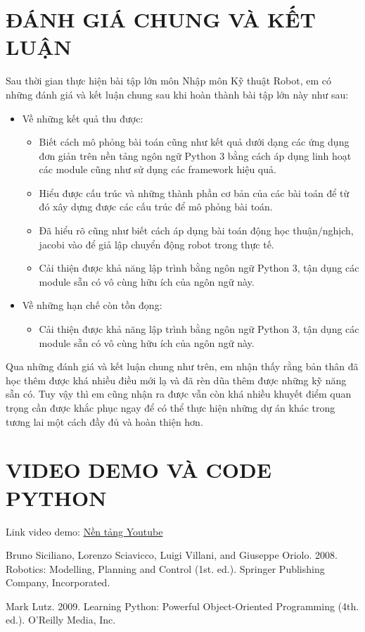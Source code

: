 \documentclass[a4paper]{article}
\begin{document}

\newpage
\tableofcontents
\newpage

\newpage

\newpage

\newpage

\newpage


\section{ĐÁNH GIÁ CHUNG VÀ KẾT LUẬN}
Sau thời gian thực hiện bài tập lớn môn Nhập môn Kỹ thuật Robot, em có những đánh giá và kết luận chung sau khi hoàn thành bài tập lớn này như sau:
\begin{itemize}
    \item Về những kết quả thu được:
    \begin{itemize}
        \item Biết cách mô phỏng bài toán cũng như kết quả dưới dạng các ứng dụng đơn giản trên nền tảng ngôn ngữ Python 3 bằng cách áp dụng linh hoạt các module cũng như sử dụng các framework hiệu quả.
        \item Hiểu được cấu trúc và những thành phần cơ bản của các bài toán để từ đó xây dựng được các cấu trúc để mô phỏng bài toán. 
        \item Đã hiểu rõ cũng như biết cách áp dụng bài toán động học thuận/nghịch, jacobi vào để giả lập chuyển động robot trong thực tế.
        \item Cải thiện được khả năng lập trình bằng ngôn ngữ Python 3, tận dụng các module sẵn có vô cùng hữu ích của ngôn ngữ này.
    \end{itemize}
    \item Về những hạn chế còn tồn đọng:
    \begin{itemize}
        \item Cải thiện được khả năng lập trình bằng ngôn ngữ Python 3, tận dụng các module sẵn có vô cùng hữu ích của ngôn ngữ này.
    \end{itemize}
\end{itemize}
Qua những đánh giá và kết luận chung như trên, em nhận thấy rằng bản thân đã học thêm được khá nhiều điều mới lạ và đã rèn dũa thêm được những kỹ năng sẵn có. Tuy vậy thì em cũng nhận ra được vẫn còn khá nhiều khuyết điểm quan trọng cần được khắc phục ngay để có thể thực hiện những dự án khác trong tương lai một cách đầy đủ và hoàn thiện hơn. 
\section{VIDEO DEMO VÀ CODE PYTHON}
Link video demo: \href{}{Nền tảng Youtube}\\

\begin{thebibliography}{99999}

Bruno Siciliano, Lorenzo Sciavicco, Luigi Villani, and Giuseppe Oriolo. 2008. Robotics: Modelling, Planning and Control (1st. ed.). Springer Publishing Company, Incorporated.

Mark Lutz. 2009. Learning Python: Powerful Object-Oriented Programming (4th. ed.). O'Reilly Media, Inc.

\end{thebibliography}
\end{document}
